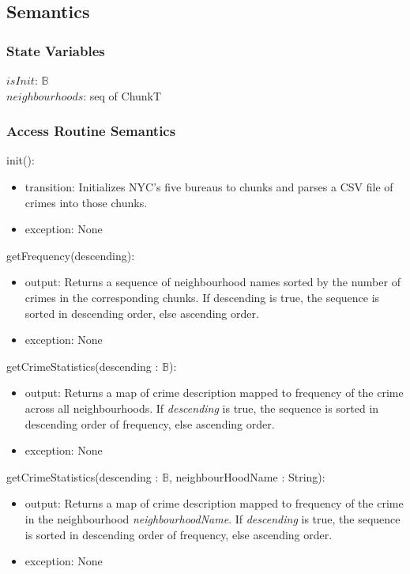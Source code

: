\documentclass[12pt]{article}
\begin{document}
\subsection* {Semantics}

\subsubsection* {State Variables}

$isInit$: $\mathbb{B}$\\
$neighbourhoods$: seq of ChunkT\\

\subsubsection* {Access Routine Semantics}

init():
\begin{itemize}
\item transition: \textnormal{\small{Initializes NYC's five bureaus to chunks and parses a CSV file of crimes into those chunks. }}
\item exception: None
\end{itemize}

\noindent getFrequency(descending):
\begin{itemize}
\item output: \textnormal{\small{Returns a sequence of neighbourhood names sorted by the number of crimes in the corresponding chunks. If descending is true, the sequence is sorted in descending order, else ascending order. }}
\item exception: None
\end{itemize}

\noindent getCrimeStatistics(descending : $\mathbb{B}$):
\begin{itemize}
\item output: \textnormal{\small{Returns a map of crime description mapped to frequency of the crime across all neighbourhoods. If \textit{descending} is true, the sequence is sorted in descending order of frequency, else ascending order. }}
\item exception: None
\end{itemize}

\noindent getCrimeStatistics(descending : $\mathbb{B}$, neighbourHoodName : String):
\begin{itemize}
\item output: \textnormal{\small{Returns a map of crime description mapped to frequency of the crime in the neighbourhood \textit{neighbourhoodName}. If \textit{descending} is true, the sequence is sorted in descending order of frequency, else ascending order. }}
\item exception: None
\end{itemize}
\end{document}
